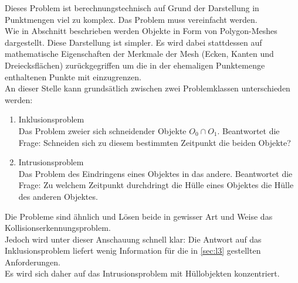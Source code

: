 Dieses Problem ist berechnungstechnisch auf Grund der Darstellung in Punktmengen viel zu komplex. Das Problem muss vereinfacht werden.\\
Wie in Abschnitt \label{sec:l0_objects} beschrieben werden Objekte in Form von Polygon-Meshes dargestellt. Diese Darstellung ist simpler. Es wird dabei stattdessen auf mathematische Eigenschaften der Merkmale der Mesh (Ecken, Kanten und Dreiecksflächen) zurückgegriffen um die in der ehemaligen Punktemenge enthaltenen Punkte mit einzugrenzen.\\
An dieser Stelle kann grundsätlich zwischen zwei Problemklassen unterschieden werden:
\begin{enumerate}
	\item Inklusionsproblem\\
		Das Problem zweier sich schneidender Objekte $O_0 \cap O_1$. Beantwortet die Frage: Schneiden sich zu diesem bestimmten Zeitpunkt die beiden Objekte?
	\item Intrusionsproblem\\
		Das Problem des Eindringens eines Objektes in das andere. Beantwortet die Frage: Zu welchem Zeitpunkt durchdringt die Hülle eines Objektes die Hülle des anderen Objektes.
\end{enumerate}
Die Probleme sind ähnlich und Lösen beide in gewisser Art und Weise das Kollisionserkennungsproblem.\\
Jedoch wird unter dieser Anschauung schnell klar: Die Antwort auf das Inklusionsproblem liefert wenig Information für die in \ref{sec:l3} gestellten Anforderungen.\\
Es wird sich daher auf das Intrusionsproblem mit Hüllobjekten konzentriert.


